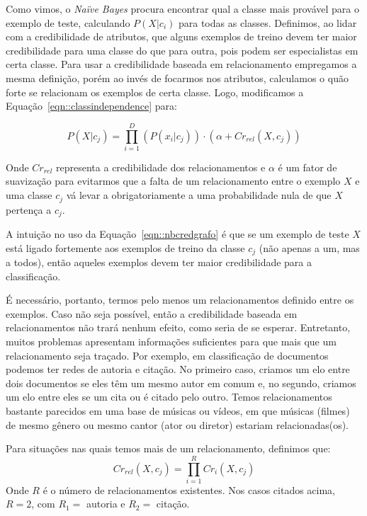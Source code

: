 Como vimos, o \textit{Naïve Bayes} procura encontrar qual a classe mais provável para o exemplo de teste, calculando $P(X|c_i)$ para todas as classes. Definimos, ao lidar com a credibilidade de atributos, que alguns exemplos de treino devem ter maior credibilidade para uma classe do que para outra, pois podem ser especialistas em certa classe. Para usar a credibilidade baseada em relacionamento empregamos a mesma definição, porém ao invés de focarmos nos atributos, calculamos o quão forte se relacionam os exemplos de certa classe. Logo, modificamos a Equação~\ref{eqn::classindependence} para:

\begin{equation}\label{eqn::nbcredgrafo}
P(X|c_{j}) = \prod^{D}_{i=1}{(P(x_i|c_j)) \cdot (\alpha + Cr_{rel}(X,c_j)) } 
\end{equation}

Onde $Cr_{rel}$ representa a credibilidade dos relacionamentos e $\alpha$ é um fator de suavização para evitarmos que a falta de um relacionamento entre o exemplo $X$ e uma classe $c_j$ vá levar a obrigatoriamente a uma probabilidade nula de que $X$ pertença a $c_j$.

A intuição no uso da Equação~\ref{eqn::nbcredgrafo} é que se um exemplo de teste $X$ está ligado fortemente aos exemplos de treino da classe $c_j$ (não apenas a um, mas a todos), então aqueles exemplos devem ter maior credibilidade para a classificação. %

É necessário, portanto, termos pelo menos um relacionamentos definido entre os exemplos. Caso não seja possível, então a credibilidade baseada em relacionamentos não trará nenhum efeito, como seria de se esperar. Entretanto, muitos problemas apresentam informações suficientes para que mais que um relacionamento seja traçado. Por exemplo, em classificação de documentos podemos ter redes de autoria e citação.
No primeiro caso, criamos um elo entre dois documentos se eles têm um mesmo autor em comum e, no segundo, criamos um elo entre eles se um cita ou é citado pelo outro. 
Temos relacionamentos bastante parecidos em uma base de músicas ou vídeos, em que músicas (filmes) de mesmo gênero ou mesmo cantor (ator ou diretor) estariam relacionadas(os). 

Para situações nas quais temos mais de um relacionamento, definimos que:
\begin{equation}\label{eqn::nbcredgrafo}
Cr_{rel}(X, c_j) = \prod^{R}_{i=1} {Cr_{i}(X,c_j)} 
\end{equation}
Onde $R$ é o número de relacionamentos existentes. Nos casos citados acima, $R=2$, com $R_1 =$ autoria e $R_2=$ citação.

